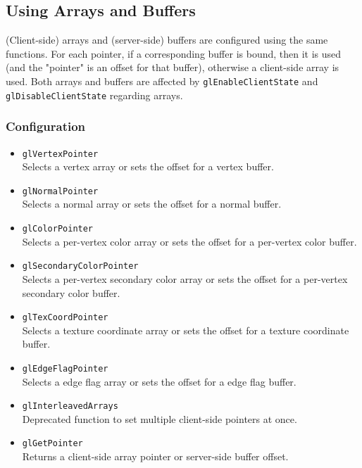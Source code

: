 \documentclass[12pt]{article}
\begin{document}
\subsection{Using Arrays and Buffers}
(Client-side) arrays and (server-side) buffers are configured using the same functions. For each pointer, if a corresponding
buffer is bound, then it is used (and the "pointer" is an offset for that buffer), otherwise a client-side array is used. Both arrays
and buffers are affected by \texttt{glEnableClientState} and \texttt{glDisableClientState} regarding arrays.

\subsubsection{Configuration}
\begin{itemize}
\item \texttt{glVertexPointer} \\
	Selects a vertex array or sets the offset for a vertex buffer.
\item \texttt{glNormalPointer} \\
	Selects a normal array or sets the offset for a normal buffer.
\item \texttt{glColorPointer} \\
	Selects a per-vertex color array or sets the offset for a per-vertex color buffer.
\item \texttt{glSecondaryColorPointer} \\
	Selects a per-vertex secondary color array or sets the offset for a per-vertex secondary color buffer.
\item \texttt{glTexCoordPointer} \\
	Selects a texture coordinate array or sets the offset for a texture coordinate buffer.
\item \texttt{glEdgeFlagPointer} \\
	Selects a edge flag array or sets the offset for a edge flag buffer.
\item \texttt{glInterleavedArrays} \\
	Deprecated function to set multiple client-side pointers at once.
\item \texttt{glGetPointer} \\
	Returns a client-side array pointer or server-side buffer offset.
\end{itemize}
\end{document}
